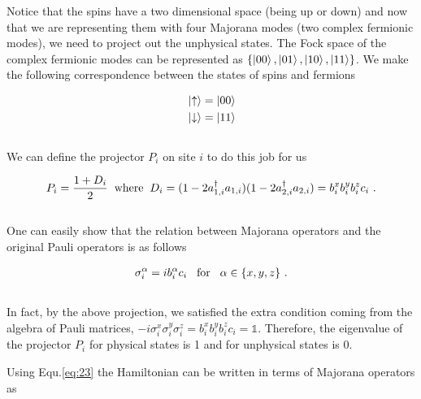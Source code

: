 \documentclass{article}
\begin{document}
Notice that the spins have a two dimensional space (being up or down) and now that we are representing them with four Majorana modes (two complex fermionic modes), we need to project out the unphysical states. The Fock space of the complex fermionic modes can be represented as $\{\ket{00}, \ket{01}, \ket{10}, \ket{11}\}$. We make the following correspondence between the states of spins and fermions 

\begin{equation}\label{eq:21}
    \begin{aligned}
        & \ket{\uparrow} = \ket{00} \\
        & \ket{\downarrow} = \ket{11}
    \end{aligned}
\end{equation}{}\\

We can define the projector $P_i$ on site $i$ to do this job for us

\begin{equation}\label{eq:22}
    \begin{aligned}
        P_i = \frac{1+D_i}{2} \hspace{2mm}\text{where}\hspace{2mm} D_i = (1-2a^\dagger_{1,i}a_{1,i})(1-2a^\dagger_{2,i}a_{2,i}) = b^x_i b^y_i b^z_i c_i~.
    \end{aligned}
\end{equation}{}\\

One can easily show that the relation between Majorana operators and the original Pauli operators is as follows

\begin{equation}\label{eq:23}
    \begin{aligned}
        \sigma^\alpha_i = i b^\alpha_i c_i \hspace{3mm}\text{for}\hspace{3mm} \alpha\in \{x,y,z\}~.\\
    \end{aligned}
\end{equation}{}\\

In fact, by the above projection, we satisfied the extra condition coming from the algebra of Pauli matrices, $-i\sigma^x_i\sigma^y_i\sigma^z_i = b^x_i b^y_i b^z_i c_i = \mathbb{1}$. Therefore, the eigenvalue of the projector $P_i$ for physical states is 1 and for unphysical states is 0.

Using Equ.\hspace{0.2mm}\ref{eq:23} the Hamiltonian can be written in terms of Majorana operators as
\end{document}
